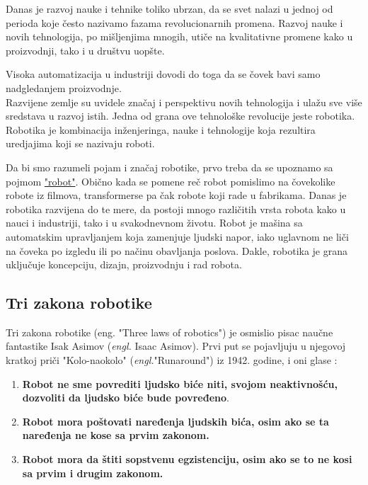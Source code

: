\documentclass{article}
\begin{document}
	Danas je razvoj nauke i tehnike toliko ubrzan, da se svet nalazi u jednoj od perioda koje često nazivamo fazama revolucionarnih promena. Razvoj nauke i novih tehnologija, po mišljenjima mnogih, utiče na kvalitativne promene kako u proizvodnji, tako i u društvu uopšte.
	
	Visoka automatizacija u industriji dovodi do toga da se čovek bavi samo nadgledanjem proizvodnje.\\
	Razvijene zemlje su uvidele značaj i perspektivu novih tehnologija i ulažu sve više sredstava u razvoj istih. Jedna od grana ove tehnološke revolucije jeste robotika. Robotika je kombinacija inženjeringa, nauke i tehnologije koja rezultira uredjajima koji se nazivaju roboti. \cite{robotics2022,robots2022}
	
	
	
	Da bi smo razumeli pojam i značaj robotike, prvo treba da se upoznamo sa pojmom \href{https://www.sciencefriday.com/segments/the-origin-of-the-word-robot/}{"robot"}.\cite{word robot}
	Obično kada se pomene reč robot pomislimo na čovekolike robote iz filmova, transformerse pa čak robote koji rade u fabrikama. Danas je robotika razvijena do te mere, da postoji mnogo različitih vrsta robota kako u nauci i industriji, tako i u svakodnevnom životu. Robot je mašina sa automatskim upravljanjem koja zamenjuje ljudski napor, iako uglavnom ne liči na čoveka po izgledu ili po načinu obavljanja poslova. Dakle, robotika je grana uključuje koncepciju, dizajn, proizvodnju i rad robota. \cite{robots in nowdays}
	
	\subsection{Tri zakona robotike}
	Tri zakona robotike (eng. "Three laws of robotics") je osmislio pisac naučne fantastike Isak Asimov (\emph{engl.} Isaac Asimov). Prvi put se pojavljuju u njegovoj kratkoj priči "Kolo-naokolo" (\emph{engl.}"Runaround") iz 1942. godine, i oni glase \cite{three laws of robotics}:
	\begin{enumerate}
	\item \textbf{Robot ne sme povrediti ljudsko biće niti, svojom neaktivnošću, dozvoliti da ljudsko biće bude povređeno}.
	
	\item \textbf{Robot mora poštovati naređenja ljudskih bića, osim ako se ta naređenja ne kose sa prvim zakonom.}
	
	\item \textbf{Robot mora da štiti sopstvenu egzistenciju, osim ako se to ne kosi sa prvim i drugim zakonom.}
	\end{enumerate}
	
\end{document}
